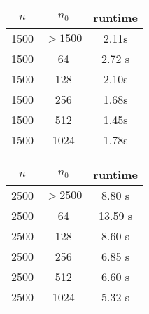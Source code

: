 \documentclass{article}
\begin{document}
\begin{center}
\begin{tabular} { |c|c|c| }
\hline
$n$ & $n_0$ & runtime \\
\hline\hline
1500 & $>1500$ & 2.11s \\
\hline\hline
1500 & 64 & 2.72 s \\
\hline
1500 & 128 & 2.10s \\
\hline
1500 & 256 & 1.68s\\
\hline
1500 & 512 & 1.45s \\ 
\hline
1500 & 1024 & 1.78s\\
\hline
\end{tabular}
\end{center}

\begin{center}
\begin{tabular} { |c|c|c| }
\hline
$n$ & $n_0$ & runtime \\
\hline\hline
2500 & $>2500$ & 8.80 s \\
\hline\hline
2500 & 64 &  13.59 s \\
\hline
2500 & 128 & 8.60 s \\
\hline
2500 & 256 &  6.85 s\\
\hline
2500 & 512 & 6.60 s \\ 
\hline
2500 & 1024 & 5.32 s\\
\hline
\end{tabular}
\end{center}
\end{document}

